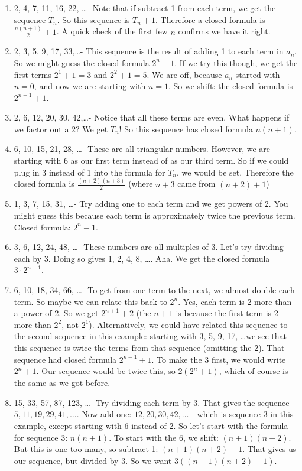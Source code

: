 \documentclass[12pt]{article}
\begin{document}
\begin{example}
\begin{solution}
    \begin{enumerate}
    \item 2, 4, 7, 11, 16, 22, \ldots - Note that if subtract 1 from each term, we get the sequence $T_n$.  So this sequence is $T_n + 1$.  Therefore a closed formula is $\frac{n(n+1)}{2} + 1$.  A quick check of the first few $n$ confirms we have it right.
    \item 2, 3, 5, 9, 17, 33,\ldots - This sequence is the result of adding 1 to each term in $a_n$.  So we might guess the closed formula $2^n + 1$.  If we try this though, we get the first terms $2^1 + 1 = 3$ and $2^2 + 1 = 5$.  We are off, because $a_n$ started with $n = 0$, and now we are starting with $n = 1$.  So we shift: the closed formula is $2^{n-1} + 1$.
    \item 2, 6, 12, 20, 30, 42,\ldots - Notice that all these terms are even.  What happens if we factor out a 2?  We get $T_n$!  So this sequence has closed formula $n(n+1)$.
    \item 6, 10, 15, 21, 28, \ldots - These are all triangular numbers.  However, we are starting with 6 as our first term instead of as our third term.  So if we could plug in 3 instead of 1 into the formula for $T_n$, we would be set.  Therefore the closed formula is $\frac{(n+2)(n+3)}{2}$ (where $n+3$ came from $(n+2)+1$)  
    \item 1, 3, 7, 15, 31, \ldots - Try adding one to each term and we get powers of 2.  You might guess this because each term is approximately twice the previous term.  Closed formula: $2^{n} - 1$.
    \item 3, 6, 12, 24, 48, \ldots - These numbers are all multiples of 3.  Let's try dividing each by 3.  Doing so gives 1, 2, 4, 8, \ldots.  Aha.  We get the closed formula $3\cdot 2^{n-1}$.  
    \item 6, 10, 18, 34, 66, \ldots - To get from one term to the next, we almost double each term.  So maybe we can relate this back to $2^n$. Yes, each term is 2 more than a power of 2.  So we get $2^{n+1} + 2$ (the $n+1$ is because the first term is 2 more than $2^2$, not $2^1$).  Alternatively, we could have related this sequence to the second sequence in this example: starting with 3, 5, 9, 17, \ldots we see that this sequence is twice the terms from that sequence (omitting the 2).  That sequence had closed formula $2^{n-1} + 1$.  To make the 3 first, we would write $2^{n} + 1$.  Our sequence would be twice this, so $2(2^n + 1)$, which of course is the same as we got before.
    \item 15, 33, 57, 87, 123, \ldots - Try dividing each term by 3.  That gives the sequence $5, 11, 19, 29, 41,\ldots$.  Now add one: $12, 20, 30, 42, \ldots$ - which is sequence 3 in this example, except starting with 6 instead of 2.  So let's start with the formula for sequence 3: $n(n+1)$.  To start with the 6, we shift: $(n+1)(n+2)$.  But this is one too many, so subtract 1: $(n+1)(n+2) - 1$.  That gives us our sequence, but divided by 3.  So we want $3((n+1)(n+2) - 1)$. 
  \end{enumerate}
\end{solution}

\end{example}
\end{document}
